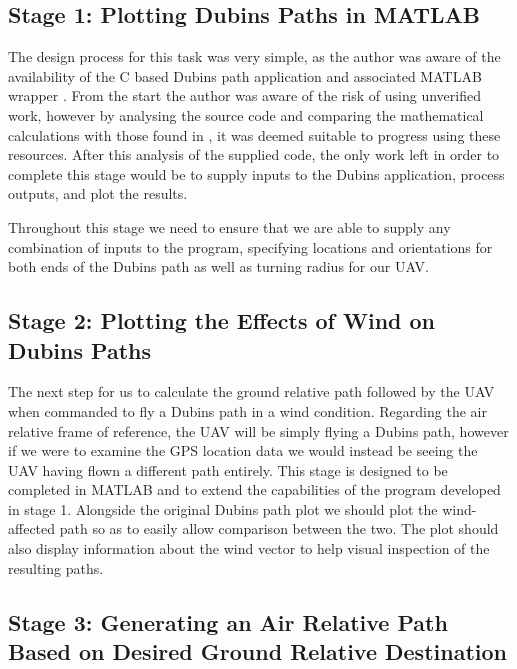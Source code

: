 \subsection{Stage 1: Plotting Dubins Paths in MATLAB}
\label{task1:design:stage1}

The design process for this task was very simple, as the author was aware of the availability of the C based Dubins path application and associated MATLAB wrapper \cite{WalkerDubinsCurves,MexDubinsCurves}. From the start the author was aware of the risk of using unverified work, however by analysing the source code and comparing the mathematical calculations with those found in \cite{shkel2001classification}, it was deemed suitable to progress using these resources. After this analysis of the supplied code, the only work left in order to complete this stage would be to supply inputs to the Dubins application, process outputs, and plot the results.

Throughout this stage we need to ensure that we are able to supply any combination of inputs to the program, specifying locations and orientations for both ends of the Dubins path as well as turning radius for our UAV.

\subsection{Stage 2: Plotting the Effects of Wind on Dubins Paths}
\label{task1:design:stage2}

The next step for us to calculate the ground relative path followed by the UAV when commanded to fly a Dubins path in a wind condition. Regarding the air relative frame of reference, the UAV will be simply flying a Dubins path, however if we were to examine the GPS location data we would instead be seeing the UAV having flown a different path entirely. This stage is designed to be completed in MATLAB and to extend the capabilities of the program developed in stage 1. Alongside the original Dubins path plot we should plot the wind-affected path so as to easily allow comparison between the two. The plot should also display information about the wind vector to help visual inspection of the resulting paths. 


\subsection{Stage 3: Generating an Air Relative Path Based on Desired Ground Relative Destination}
\label{task1:design:stage3}

